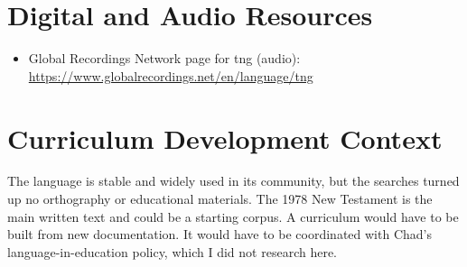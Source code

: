 \documentclass[12pt]{article}
\begin{document}
\section{Digital and Audio Resources}
\begin{itemize}
\item Global Recordings Network page for tng (audio): \url{https://www.globalrecordings.net/en/language/tng}
\end{itemize}

\section{Curriculum Development Context}
The language is stable and widely used in its community, but the searches turned up no orthography or educational materials. The 1978 New Testament is the main written text and could be a starting corpus. A curriculum would have to be built from new documentation. It would have to be coordinated with Chad's language-in-education policy, which I did not research here.
\end{document}
